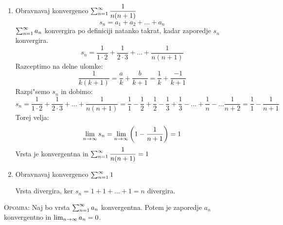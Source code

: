 \begin{enumerate}[1)]
	\item Obravnavaj konvergenco $\sum_{n = 1}^{\infty} \dfrac{1}{n(n+1)}$
	\begin{equation*}
	s_n = a_1 + a_2 + \ldots + a_n
	\end{equation*}
	$\sum_{n = 1}^{\infty}a_n$ konvergira po definiciji natanko takrat, kadar zaporedje $s_n$ konvergira.
	\begin{equation*}
	s_n = \dfrac{1}{1 \cdot 2} + \dfrac{1}{2 \cdot 3} + \ldots + \dfrac{1}{n(n+1)}
	\end{equation*}
	Razceptimo na delne ulomke:
	\begin{equation*}
	\dfrac{1}{k(k+1)} = \dfrac{a}{k} + \dfrac{b}{k+1} = \dfrac{1}{k} + \dfrac{-1}{k+1}
	\end{equation*}
	Razpi"semo $s_n$ in dobimo:
	\begin{equation*}
	s_n = \dfrac{1}{1 \cdot 2} + \dfrac{1}{2 \cdot 3} + \ldots + \dfrac{1}{n(n+1)} = \dfrac{1}{1} - \dfrac{1}{2} + \dfrac{1}{2} - \dfrac{1}{3} + \dfrac{1}{3} - \ldots + \dfrac{1}{n} - \ldots \dfrac{1}{n+2} = \dfrac{1}{1} - \dfrac{1}{n+1}
	\end{equation*}
	Torej velja:
	\begin{equation*}
	\lim_{n \rightarrow \infty} s_n = \lim_{n \rightarrow \infty}\left(1 - \dfrac{1}{n+1}\right) = 1
	\end{equation*}
	Vrsta je konvergentna in $\sum_{n = 1}^{\infty} \dfrac{1}{n(n+1)} = 1$
	
	\item Obravnavaj konvergenco $\sum_{n = 1}^{\infty} 1$
	
	Vrsta divergira, ker $s_n = 1 + 1 + \ldots + 1 = n$ divergira.
\end{enumerate}
\textsc{Opomba:} Naj bo vrsta $\sum_{n = 1}^{\infty}a_n$ konvergentna. Potem je zaporedje $a_n$ konvergentno in $\lim_{n \rightarrow \infty} a_n = 0$.

